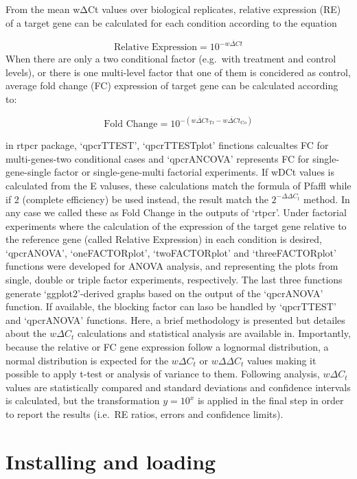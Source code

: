 \documentclass[
]{article}
\begin{document}
From the mean wΔCt values over biological replicates, relative
expression (RE) of a target gene can be calculated for each condition
according to the equation

\[\text{Relative Expression} = 10^{-\overline{w\Delta Ct}}\] When there
are only a two conditional factor (e.g.~with treatment and control
levels), or there is one multi-level factor that one of them is
concidered as control, average fold change (FC) expression of target
gene can be calculated according to:

\[\text{Fold Change}=10^{-(\overline{w\Delta Ct}_{\text{Tr}}-{\overline{w\Delta Ct}_{\text{Co}}})}\]

in rtpcr package, `qpcrTTEST', `qpcrTTESTplot' finctions calcualtes FC
for multi-genes-two conditional cases and `qpcrANCOVA' represents FC for
single-gene-single factor or single-gene-multi factorial experiments. If
wDCt values is calculated from the E valuses, these calculations match
the formula of Pfaffl while if 2 (complete efficiency) be used instead,
the result match the \(2^{-\Delta\Delta C_t}\) method. In any case we
called these as Fold Change in the outputs of `rtpcr'. Under factorial
experiments where the calculation of the expression of the target gene
relative to the reference gene (called Relative Expression) in each
condition is desired, `qpcrANOVA', `oneFACTORplot', `twoFACTORplot' and
`threeFACTORplot' functions were developed for ANOVA analysis, and
representing the plots from single, double or triple factor experiments,
respectively. The last three functions generate `ggplot2'-derived graphs
based on the output of the `qpcrANOVA' function. If available, the
blocking factor can laso be handled by `qpcrTTEST' and `qpcrANOVA'
functions. Here, a brief methodology is presented but detailes about the
\(w\Delta C_t\) calculations and statistical analysis are available in.
Importantly, because the relative or FC gene expression follow a
lognormal distribution, a normal distribution is expected for the
\(w\Delta C_t\) or \(w\Delta\Delta C_t\) values making it possible to
apply t-test or analysis of variance to them. Following analysis,
\(w\Delta C_t\) values are statistically compared and standard
deviations and confidence intervals is calculated, but the
transformation \(y = 10^x\) is applied in the final step in order to
report the results (i.e.~RE ratios, errors and confidence limits).

\hypertarget{installing-and-loading}{%
\section{Installing and loading}\label{installing-and-loading}}
\end{document}
